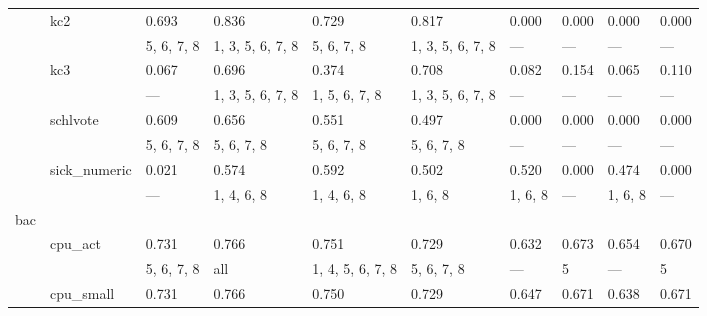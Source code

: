\documentclass{article}
\begin{document}
\begin{center}
\begin{longtable}{p{1.2cm}p{1.8cm}p{1cm}p{1cm}p{1cm}p{1cm}p{1cm}p{1cm}p{1cm}p{1cm}}
             & kc2          & 0.693         & 0.836            & 0.729            & 0.817            & 0.000            & 0.000            & 0.000            & 0.000            \\
             &              & 5, 6, 7, 8    & 1, 3, 5, 6, 7, 8 & 5, 6, 7, 8       & 1, 3, 5, 6, 7, 8 & ---              & ---              & ---              & ---              \\
             & kc3          & 0.067         & 0.696            & 0.374            & 0.708            & 0.082            & 0.154            & 0.065            & 0.110            \\
             &              & ---           & 1, 3, 5, 6, 7, 8 & 1, 5, 6, 7, 8    & 1, 3, 5, 6, 7, 8 & ---              & ---              & ---              & ---              \\
             & schlvote     & 0.609         & 0.656            & 0.551            & 0.497            & 0.000            & 0.000            & 0.000            & 0.000            \\
             &              & 5, 6, 7, 8    & 5, 6, 7, 8       & 5, 6, 7, 8       & 5, 6, 7, 8       & ---              & ---              & ---              & ---              \\
             & sick\_numeric & 0.021         & 0.574            & 0.592            & 0.502            & 0.520            & 0.000            & 0.474            & 0.000            \\
             &              & ---           & 1, 4, 6, 8       & 1, 4, 6, 8       & 1, 6, 8          & 1, 6, 8          & ---              & 1, 6, 8          & ---              \\
 bac         &              &               &                  &                  &                  &                  &                  &                  &                  \\
             & cpu\_act      & 0.731         & 0.766            & 0.751            & 0.729            & 0.632            & 0.673            & 0.654            & 0.670            \\
             &              & 5, 6, 7, 8    & all              & 1, 4, 5, 6, 7, 8 & 5, 6, 7, 8       & ---              & 5                & ---              & 5                \\
             & cpu\_small    & 0.731         & 0.766            & 0.750            & 0.729            & 0.647            & 0.671            & 0.638            & 0.671            \\

\end{longtable}
\end{center}
\end{document}
